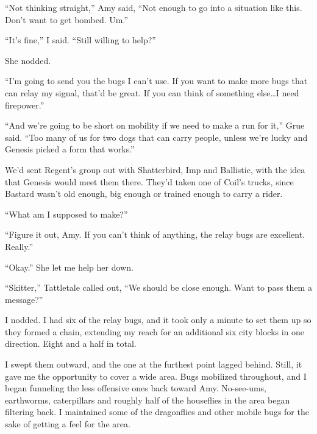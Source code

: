 ``Not thinking straight,'' Amy said, ``Not enough to go into a situation like this.  Don't want to get bombed.  Um.''



``It's fine,'' I said.  ``Still willing to help?''



She nodded.



``I'm going to send you the bugs I can't use.  If you want to make more bugs that can relay my signal, that'd be great.  If you can think of something else\ldots I need firepower.''



``And we're going to be short on mobility if we need to make a run for it,'' Grue said.  ``Too many of us for two dogs that can carry people, unless we're lucky and Genesis picked a form that works.''



We'd sent Regent's group out with Shatterbird, Imp and Ballistic, with the idea that Genesis would meet them there.  They'd taken one of Coil's trucks, since Bastard wasn't old enough, big enough or trained enough to carry a rider.



``What am I supposed to make?''



``Figure it out, Amy.  If you can't think of anything, the relay bugs are excellent.  Really.''



``Okay.''  She let me help her down.



``Skitter,''  Tattletale called out, ``We should be close enough.  Want to pass them a message?''



I nodded.  I had six of the relay bugs, and it took only a minute to set them up so they formed a chain, extending my reach for an additional six city blocks in one direction.  Eight and a half in total.



I swept them outward, and the one at the furthest point lagged behind.  Still, it gave me the opportunity to cover a wide area.  Bugs mobilized throughout, and I began funneling the less offensive ones back toward Amy.  No-see-ums, earthworms, caterpillars and roughly half of the houseflies in the area began filtering back.  I maintained some of the dragonflies and other mobile bugs for the sake of getting a feel for the area.



